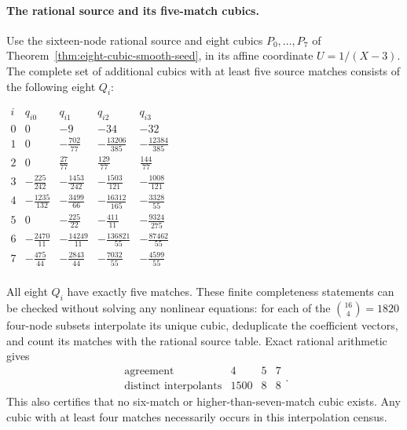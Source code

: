 \paragraph{The rational source and its five-match cubics.}
Use the sixteen-node rational source and eight cubics $P_0,\ldots,P_7$ of Theorem~\ref{thm:eight-cubic-smooth-seed}, in its affine coordinate $U=1/(X-3)$.
The complete set of additional cubics with at least five source matches consists of the following eight $Q_i$:
\begin{table}[ht]
\centering
\renewcommand{\arraystretch}{1.45}
$\begin{array}{c|rrrr}i&q_{i0}&q_{i1}&q_{i2}&q_{i3}\\\hline
0&0&-9&-34&-32\\
1&0&-\frac{702}{77}&-\frac{13206}{385}&-\frac{12384}{385}\\
2&0&\frac{27}{77}&\frac{129}{77}&\frac{144}{77}\\
3&-\frac{225}{242}&-\frac{1453}{242}&-\frac{1503}{121}&-\frac{1008}{121}\\
4&-\frac{1235}{132}&-\frac{3499}{66}&-\frac{16312}{165}&-\frac{3328}{55}\\
5&0&-\frac{225}{22}&-\frac{411}{11}&-\frac{9324}{275}\\
6&-\frac{2470}{11}&-\frac{14249}{11}&-\frac{136821}{55}&-\frac{87462}{55}\\
7&-\frac{475}{44}&-\frac{2843}{44}&-\frac{7032}{55}&-\frac{4599}{55}\\
\end{array}$
\caption{The eight additional cubics $Q_i(U)=\sum_{j=0}^3q_{ij}U^j$ with five matches on the rational source.}\label{tab:fresh-five-cubics}
\end{table}
All eight $Q_i$ have exactly five matches. These finite completeness statements can be checked without solving any nonlinear equations: for each of the $\binom{16}{4}=1820$ four-node subsets interpolate its unique cubic, deduplicate the coefficient vectors, and count its matches with the rational source table. Exact rational arithmetic gives
\[
\begin{array}{c|rrr}\text{agreement}&4&5&7\\\hline
\text{distinct interpolants}&1500&8&8\end{array}.
\]
This also certifies that no six-match or higher-than-seven-match cubic exists. Any cubic with at least four matches necessarily occurs in this interpolation census.

